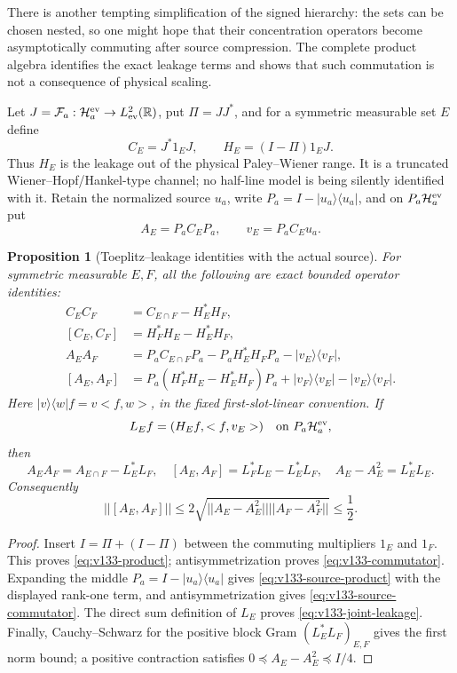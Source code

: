 \documentclass[11pt]{article}
\def\norm#1{||#1||}%
\def\ip#1#2{<#1,#2>}%
\newtheorem{proposition}[theorem]{Proposition}
\theoremstyle{remark}
\newcommand{\norm}[1]{\left\lVert #1\right\rVert}
\newcommand{\ip}[2]{\left\langle #1,#2\right\rangle}
\begin{document}
There is another tempting simplification of the signed hierarchy: the
sets can be chosen nested, so one might hope that their concentration
operators become asymptotically commuting after source compression.
The complete product algebra identifies the exact leakage terms and
shows that such commutation is not a consequence of physical scaling.

Let $J=\mathcal F_a:\mathcal H_a^{\rm ev}\to L^2_{\rm ev}(\mathbb R)$,
put $\Pi=JJ^*$, and for a symmetric measurable set $E$ define
\[
 C_E=J^*1_EJ,
 \qquad H_E=(I-\Pi)1_EJ.
\]
Thus $H_E$ is the leakage out of the physical Paley--Wiener range.  It
is a truncated Wiener--Hopf/Hankel-type channel; no half-line model is
being silently identified with it.  Retain the normalized source $u_a$,
write $P_a=I-|u_a\rangle\langle u_a|$, and on
$P_a\mathcal H_a^{\rm ev}$ put
\[
 A_E=P_aC_EP_a,
 \qquad v_E=P_aC_Eu_a.
\]

\begin{proposition}[Toeplitz--leakage identities with the actual source]
\label{prop:v133-leakage}
For symmetric measurable $E,F$, all the following are exact bounded
operator identities:
\begin{align}
 C_EC_F&=C_{E\cap F}-H_E^*H_F,\label{eq:v133-product}\\
 [C_E,C_F]&=H_F^*H_E-H_E^*H_F,\label{eq:v133-commutator}\\
 A_EA_F&=P_aC_{E\cap F}P_a-P_aH_E^*H_FP_a
          -|v_E\rangle\langle v_F|,\label{eq:v133-source-product}\\
 [A_E,A_F]&=P_a(H_F^*H_E-H_E^*H_F)P_a
 +|v_F\rangle\langle v_E|-|v_E\rangle\langle v_F|.
 \label{eq:v133-source-commutator}
\end{align}
Here $|v\rangle\langle w|f=v\ip f w$, in the fixed first-slot-linear
convention.  If
\[
 L_Ef=(H_Ef,\ip f{v_E})
 \quad\hbox{on }P_a\mathcal H_a^{\rm ev},
\]
then
\begin{equation}
 A_EA_F=A_{E\cap F}-L_E^*L_F,
 \quad [A_E,A_F]=L_F^*L_E-L_E^*L_F,
 \quad A_E-A_E^2=L_E^*L_E.\label{eq:v133-joint-leakage}
\end{equation}
Consequently
\[
 \norm{[A_E,A_F]}
 \le2\sqrt{\norm{A_E-A_E^2}\norm{A_F-A_F^2}}
 \le\frac12.
\]
\end{proposition}
\begin{proof}
Insert $I=\Pi+(I-\Pi)$ between the commuting multipliers $1_E$ and
$1_F$.  This proves \eqref{eq:v133-product}; antisymmetrization proves
\eqref{eq:v133-commutator}.  Expanding the middle
$P_a=I-|u_a\rangle\langle u_a|$ gives
\eqref{eq:v133-source-product} with the displayed rank-one term, and
antisymmetrization gives \eqref{eq:v133-source-commutator}.  The direct
sum definition of $L_E$ proves \eqref{eq:v133-joint-leakage}.  Finally,
Cauchy--Schwarz for the positive block Gram
$(L_E^*L_F)_{E,F}$ gives the first norm bound; a positive contraction
satisfies $0\preceq A_E-A_E^2\preceq I/4$.
\end{proof}
\end{document}

